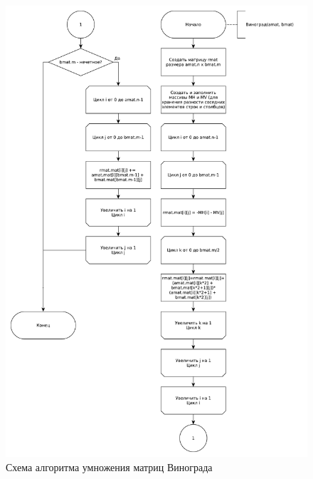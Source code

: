 \begin{figure}[ht!]
	\centering
	\includegraphics[width=0.95\linewidth]{assets/mtx-win1.pdf}
	\caption{Схема алгоритма умножения матриц Винограда}
	\label{fig:win-1}
\end{figure}
